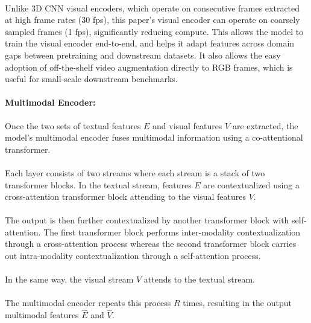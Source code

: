 \documentclass{article}
\begin{document}
\paragraph{}Unlike 3D CNN visual encoders, which operate on consecutive frames extracted at high frame
rates (30 fps), this paper's visual encoder can operate on coarsely sampled frames (1 fps), significantly
reducing compute. This allows the model to train the visual encoder end-to-end, and helps it adapt
features across domain gaps between pretraining and downstream datasets. It also allows the easy adoption
of off-the-shelf video augmentation directly to RGB frames, which is useful for small-scale downstream 
benchmarks.

\paragraph{Multimodal Encoder:}Once the two sets of textual features $E$ and visual features $V$ are 
extracted, the model's multimodal encoder fuses multimodal information using a co-attentional transformer.

\paragraph{}Each layer consists of two streams where each stream is a stack of two transformer blocks.
In the textual stream, features $E$ are contextualized using a cross-attention transformer block 
attending to the visual features $V$.

\paragraph{}The output is then further contextualized by another transformer block with self-attention.
The first transformer block performs inter-modality contextualization through a cross-attention process
whereas the second transformer block carries out intra-modality contextualization through a self-attention
process. 

\paragraph{}In the same way, the visual stream $V$ attends to the textual stream. 

\paragraph{}The multimodal encoder repeats this process $R$ times, resulting in the output
multimodal features $\hat{E}$ and $\hat{V}$.
\end{document}

